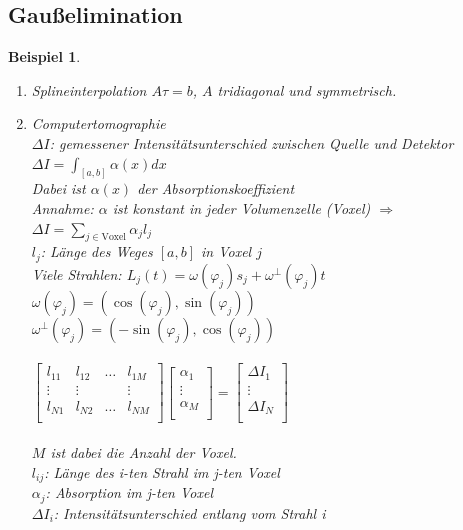 \documentclass[12pt]{article}
\theoremstyle{break}
\newtheorem{example}[theorem]{Beispiel}
\begin{document}
\subsection{Gaußelimination}
%
\begin{example}\leavevmode
\begin{enumerate}
  \item[a)] Splineinterpolation $A\tau = b$, $A$ tridiagonal und symmetrisch.
  \item[b)] Computertomographie \\
    $\Delta I$: gemessener Intensitätsunterschied zwischen Quelle und Detektor \\
    $\Delta I = \int_{[a,b]} \alpha(x) dx$\\
    Dabei ist $\alpha(x)$ der Absorptionskoeffizient\\
    Annahme: $\alpha$ ist konstant in jeder Volumenzelle (Voxel) $\Rightarrow$\\
    $\Delta I = \sum_{j \in \text{Voxel}} \alpha_j l_j$\\
    $l_j$: Länge des Weges $[a,b]$ in Voxel $j$\\
    Viele Strahlen: $L_j(t) = \omega ( \varphi_j ) s_j + \omega^{\perp} ( \varphi_j ) t$\\
    $\omega(\varphi_j) = (\cos(\varphi_j), \sin(\varphi_j))$\\
    $\omega^{\perp}(\varphi_j) = (-\sin(\varphi_j), \cos(\varphi_j))$ \\\\
    $\begin{bmatrix} 
    l_{11} & l_{12} & \dots & l_{1M} \\
    \vdots & \vdots & & \vdots \\
    l_{N1} & l_{N2} & \dots & l_{NM} \\
    \end{bmatrix}
    \begin{bmatrix}
    \alpha_1 \\
    \vdots \\
    \alpha_M \\
    \end{bmatrix}
    =
    \begin{bmatrix}
    \Delta I_1 \\
    \vdots \\
    \Delta I_N \\
    \end{bmatrix}$\\\\
    $M$ ist dabei die Anzahl der Voxel.\\
    $l_{ij}$: Länge des i-ten Strahl im j-ten Voxel\\
    $\alpha_j$: Absorption im j-ten Voxel \\
    $\Delta I_i$: Intensitätsunterschied entlang vom Strahl i
\end{enumerate}
\end{example}
\end{document}
